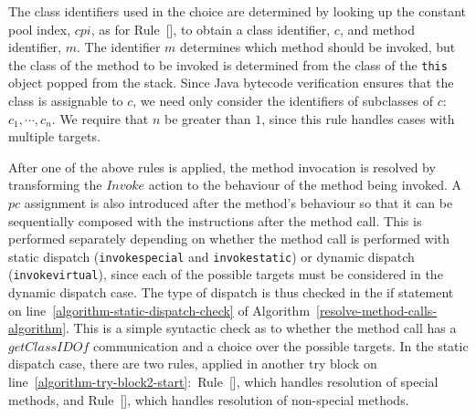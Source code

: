 The class identifiers used in the choice are determined by looking up
the constant pool index, $cpi$, as for
Rule~[], to obtain a class
identifier, $c$, and method identifier, $m$.
The identifier $m$ determines which method should be invoked, but the
class of the method to be invoked is determined from the class of the
\texttt{this} object popped from the stack.
Since Java bytecode verification ensures that the class is assignable
to $c$, we need only consider the identifiers of subclasses of
$c$:~$c_1, \cdots , c_n$.
We require that $n$ be greater than $1$, since this rule handles cases
with multiple targets.

After one of the above rules is applied, the method invocation is
resolved by transforming the $Invoke$ action to the behaviour of the
method being invoked.
A $pc$ assignment is also introduced after the
method's behaviour so that it can be sequentially composed with the
instructions after the method call.
This is performed separately depending on whether the method call is
performed with static dispatch (\texttt{invokespecial} and
\texttt{invokestatic}) or dynamic dispatch (\texttt{invokevirtual}),
since each of the possible targets must be considered in the dynamic
dispatch case.
The type of dispatch is thus checked in the if statement on
line~\ref{algorithm-static-dispatch-check} of
Algorithm~\ref{resolve-method-calls-algorithm}.
This is a simple syntactic check as to whether the method call has a
$getClassIDOf$ communication and a choice over the possible targets.
In the static dispatch case, there are two rules, applied in another
try block on
line~\ref{algorithm-try-block2-start}:~Rule~[],
which handles resolution of special methods, and
Rule~[], which handles resolution
of non-special methods.

